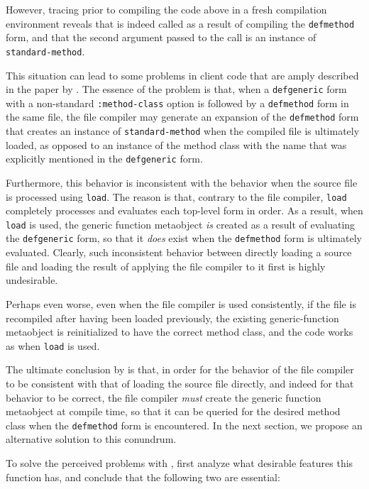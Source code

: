 However, tracing \mml{} prior to compiling the code above in a fresh
compilation environment reveals that \mml{} is indeed called as a
result of compiling the \texttt{defmethod} form, and that the second
argument passed to the call is an instance of
\texttt{standard-method}.

This situation can lead to some problems in client code that are amply
described in the paper by \cnh{}.  The essence of the
problem is that, when a \texttt{defgeneric} form with a
non-standard \texttt{:method-class} option is followed by a
\texttt{defmethod} form in the same file, the file compiler may
generate an expansion of the \texttt{defmethod} form that creates an
instance of \texttt{standard-method} when the compiled file is
ultimately loaded, as opposed to an instance of the method class with
the name that was explicitly mentioned in the \texttt{defgeneric}
form.

Furthermore, this behavior is inconsistent with the behavior when the
source file is processed using \texttt{load}.  The reason is that,
contrary to the file compiler, \texttt{load} completely processes and
evaluates each top-level form in order.  As a result, when
\texttt{load} is used, the generic function metaobject \emph{is}
created as a result of evaluating the \texttt{defgeneric} form, so
that it \emph{does} exist when the \texttt{defmethod} form is
ultimately evaluated.  Clearly, such inconsistent behavior between
directly loading a source file and loading the result of applying the
file compiler to it first is highly undesirable.

Perhaps even worse, even when the file compiler is used consistently,
if the file is recompiled after having been loaded previously, the
existing generic-function metaobject is reinitialized to have the
correct method class, and the code works as when \texttt{load} is
used.

The ultimate conclusion by \cnh{} is that, in order for
the behavior of the file compiler to be consistent with that of
loading the source file directly, and indeed for that behavior to be
correct, the file compiler \emph{must} create the generic function
metaobject at compile time, so that it can be queried for the desired
method class when the \texttt{defmethod} form is encountered.  In the
next section, we propose an alternative solution to this conundrum.

To solve the perceived problems with \mml{}, \cnh{} first analyze what
desirable features this function has, and conclude that the following
two are essential:

